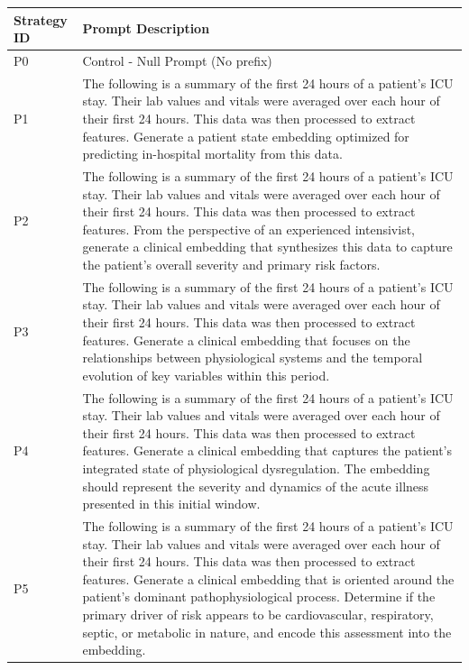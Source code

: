 \begin{tabular}{l p{12cm}}
\toprule
Strategy ID & Prompt Description \\
\midrule
P0 & Control - Null Prompt (No prefix) \\
P1 & The following is a summary of the first 24 hours of a patient's ICU stay. Their lab values and vitals were averaged over each hour of their first 24 hours. This data was then processed to extract features.  Generate a patient state embedding optimized for predicting in-hospital mortality from this data. \\
P2 & The following is a summary of the first 24 hours of a patient's ICU stay. Their lab values and vitals were averaged over each hour of their first 24 hours. This data was then processed to extract features.  From the perspective of an experienced intensivist, generate a clinical embedding that synthesizes this data to capture the patient's overall severity and primary risk factors. \\
P3 & The following is a summary of the first 24 hours of a patient's ICU stay. Their lab values and vitals were averaged over each hour of their first 24 hours. This data was then processed to extract features.  Generate a clinical embedding that focuses on the relationships between physiological systems and the temporal evolution of key variables within this period. \\
P4 & The following is a summary of the first 24 hours of a patient's ICU stay. Their lab values and vitals were averaged over each hour of their first 24 hours. This data was then processed to extract features.  Generate a clinical embedding that captures the patient's integrated state of physiological dysregulation. The embedding should represent the severity and dynamics of the acute illness presented in this initial window. \\
P5 & The following is a summary of the first 24 hours of a patient's ICU stay. Their lab values and vitals were averaged over each hour of their first 24 hours. This data was then processed to extract features.  Generate a clinical embedding that is oriented around the patient's dominant pathophysiological process. Determine if the primary driver of risk appears to be cardiovascular, respiratory, septic, or metabolic in nature, and encode this assessment into the embedding. \\
\bottomrule
\end{tabular}
